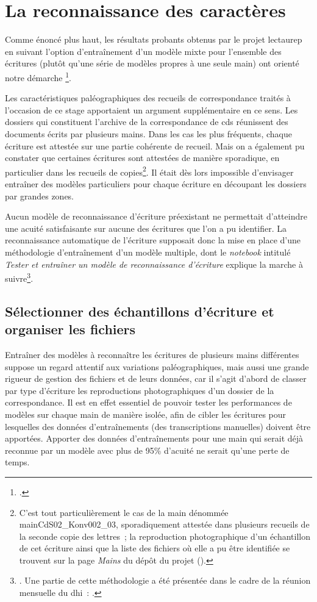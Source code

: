 \documentclass[a4paper,12pt,twoside]{book}
\begin{document}
		\section{La reconnaissance des caractères}
			Comme énoncé plus haut, les résultats probants obtenus par le projet \gls{lectaurep} en suivant l'option d'entraînement d'un modèle mixte pour l'ensemble des écritures (plutôt qu'une série de modèles propres à une seule main) ont orienté notre démarche \footcite{chagueCreationModelesTranscriptiona}.
			
			Les caractéristiques paléographiques des recueils de correspondance traités à l'occasion de ce stage apportaient un argument supplémentaire en ce sens. Les dossiers qui constituent l'archive de la correspondance de \gls{cds} réunissent des documents écrits par plusieurs mains. Dans les cas les plus fréquents, chaque écriture est attestée sur une partie cohérente de recueil. Mais on a également pu constater que certaines écritures sont attestées de manière sporadique, en particulier dans les recueils de copies\footnote{C'est tout particulièrement le cas de la main dénommée mainCdS02\_Konv002\_03, sporadiquement attestée dans plusieurs recueils de la seconde copie des lettres~; la reproduction photographique d'un échantillon de cet écriture ainsi que la liste des fichiers où elle a pu être identifiée se trouvent sur la page \textit{Mains} du dépôt du projet (\cite{biayMains2022}).}. Il était dès lors impossible d'envisager entraîner des modèles particuliers pour chaque écriture en découpant les dossiers par grandes zones.
			
			Aucun modèle de reconnaissance d'écriture préexistant ne permettait d'atteindre une acuité satisfaisante sur aucune des écritures que l'on a pu identifier. La reconnaissance automatique de l'écriture supposait donc la mise en place d'une méthodologie d'entraînement d'un modèle multiple, dont le \textit{notebook} intitulé \textit{Tester et entraîner un modèle de reconnaissance d'écriture} explique la marche à suivre\footnote{\cite{biayTesterEntrainerModele2022}. Une partie de cette méthodologie a été présentée dans le cadre de la réunion mensuelle du \gls{dhi}~: \cite{biayIntelligenceArtificelleIHA2022}.}.
			
			\subsection{Sélectionner des échantillons d'écriture et organiser les fichiers}
				Entraîner des modèles à reconnaître les écritures de plusieurs mains différentes suppose un regard attentif aux variations paléographiques, mais aussi une grande rigueur de gestion des fichiers et de leurs données, car il s'agit d'abord de classer par type d'écriture les reproductions photographiques d'un dossier de la correspondance. Il est en effet essentiel de pouvoir tester les performances de modèles sur chaque main de manière isolée, afin de cibler les écritures pour lesquelles des données d'entraînements (des transcriptions manuelles) doivent être apportées. Apporter des données d'entraînements pour une main qui serait déjà reconnue par un modèle avec plus de 95\% d'acuité ne serait qu'une perte de temps.
				
\end{document}
